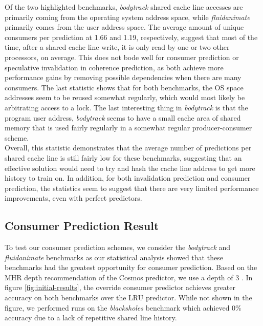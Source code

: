        Of the two highlighted benchmarks, \textit{bodytrack} shared cache line accesses are primarily coming from the operating system address space, while \textit{fluidanimate} primarily comes from the user address space. The average amount of unique consumers per prediction at 1.66 and 1.19, respectively, suggest that most of the time, after a shared cache line write, it is only read by one or two other processors, on average. This does not bode well for consumer prediction or speculative invalidation in coherence prediction, as both achieve more performance gains by removing possible dependencies when there are many consumers. The last statistic shows that for both benchmarks, the OS space addresses seem to be reused somewhat regularly, which would most likely be arbitrating access to a lock. The last interesting thing in \textit{bodytrack} is that the program user address, \textit{bodytrack} seems to have a small cache area of shared memory that is used fairly regularly in a somewhat regular producer-consumer scheme. \\
        
        Overall, this statistic demonstrates that the average number of predictions per shared cache line is still fairly low for these benchmarks, suggesting that an effective solution would need to try and hash the cache line address to get more history to train on. In addition, for both invalidation prediction and consumer prediction, the statistics seem to suggest that there are very limited performance improvements, even with perfect predictors.

    \subsection{Consumer Prediction Result}
        To test our consumer prediction schemes, we consider the \textit{bodytrack} and \textit{fluidanimate} benchmarks as our statistical analysis showed that these benchmarks had the greatest opportunity for consumer prediction. Based on the MHR depth recommendation of the Cosmos predictor, we use a depth of 3 \cite{mukherjee_using_nodate}. In figure \ref{fig:initial-results}, the override consumer predictor achieves greater accuracy on both benchmarks over the LRU predictor. While not shown in the figure, we performed runs on the \textit{blacksholes} benchmark which achieved 0\% accuracy due to a lack of repetitive shared line history.  

